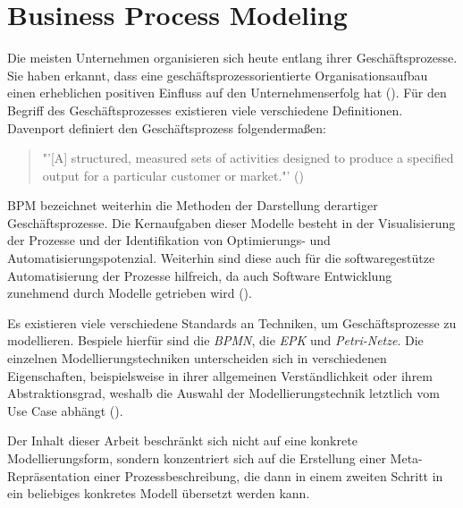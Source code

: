 \section{Business Process Modeling}
Die meisten Unternehmen organisieren sich heute entlang ihrer Geschäftsprozesse. Sie haben erkannt, dass eine geschäftsprozessorientierte Organisationsaufbau einen erheblichen positiven Einfluss auf den Unternehmenserfolg hat (\cite[vgl.][1]{BPM2}). Für den Begriff des Geschäftsprozesses existieren viele verschiedene Definitionen. Davenport definiert den Geschäftsprozess folgendermaßen: 
\begin{quote}
"'[A] structured, measured sets of activities designed to produce a specified output for a particular customer or market."' (\cite[5]{DAVENPORT})
\end{quote} \ac{BPM} bezeichnet weiterhin die Methoden der Darstellung derartiger Geschäftsprozesse. Die Kernaufgaben dieser Modelle besteht in der Visualisierung der Prozesse und der Identifikation von Optimierungs- und Automatisierungspotenzial. Weiterhin sind diese auch für die softwaregestütze Automatisierung der Prozesse hilfreich, da auch Software Entwicklung zunehmend durch Modelle getrieben wird (\cite[vgl.][74]{BPM}).\par
Es existieren viele verschiedene Standards an Techniken, um  Geschäftsprozesse zu modellieren. Bespiele hierfür sind die \textit{\ac{BPMN}}, die \textit{\ac{EPK}} und \textit{Petri-Netze}. Die einzelnen Modellierungstechniken unterscheiden sich in verschiedenen Eigenschaften, beispielsweise in ihrer allgemeinen Verständlichkeit oder ihrem Abstraktionsgrad, weshalb die Auswahl der Modellierungstechnik letztlich vom Use Case abhängt (\cite[vgl.][75]{BPM2}).
\par
Der Inhalt dieser Arbeit beschränkt sich nicht auf eine konkrete Modellierungsform, sondern konzentriert sich auf die Erstellung einer Meta-Repräsentation einer Prozessbeschreibung, die dann in einem zweiten Schritt in ein beliebiges konkretes Modell übersetzt werden kann.